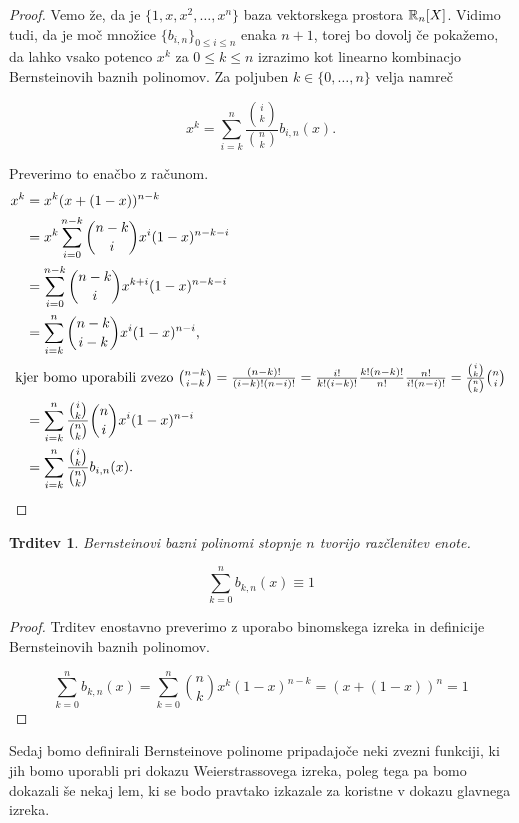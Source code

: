 \documentclass[a4paper, reqno]{amsart}
\theoremstyle{theorem}
\newtheorem{trditev}[izrek]{Trditev}
\theoremstyle{definition}
\begin{document}
\begin{proof}
	Vemo že, da je $\{1, x, x^2, \dots, x^n\}$ baza vektorskega prostora $\mathbb{R}_n[X]$.
	Vidimo tudi, da je moč množice $\{b_{i,n}\}_{0 \leq i \leq n}$ enaka $n + 1$,
	torej bo dovolj če pokažemo, da lahko vsako potenco $x^k$ za $0 \leq k \leq n$
	izrazimo kot linearno kombinacjo Bernsteinovih baznih polinomov. Za poljuben 
	$k \in \{0, \dots, n\}$ velja namreč

	$$ x^k = \sum_{i = k}^{n} \frac{\binom ik}{\binom nk} b_{i, n}(x)\text{.}$$

	Preverimo to enačbo z računom.
	\begin{align*}
	x^k &= x^k(x + (1 - x))^{n - k} \\
	&= x^k \sum_{i = 0}^{n - k} \binom{n - k}{i} x^i(1 - x)^{n - k - i} \\
	&= \sum_{i = 0}^{n - k} \binom{n - k}{i} x^{k + i}(1 - x)^{n - k - i} \\
	&= \sum_{i = k}^{n} \binom{n - k}{i - k} x^i(1 - x)^{n - i} \text{,}\\
\intertext{
	kjer bomo uporabili zvezo $ \binom{n - k}{i - k} = \frac{(n - k)!}{(i - k)!(n - i)!} =
	\frac{i!}{k!(i - k)!} \frac{k! (n - k)!}{n!} \frac{n!}{i!(n - i)!} =
	\frac{\binom ik}{\binom nk} \binom ni $
}
	&= \sum_{i = k}^{n} \frac{\binom ik}{\binom nk} \binom ni x^i(1 - x)^{n - i} \\
	&= \sum_{i = k}^{n} \frac{\binom ik}{\binom nk} b_{i, n}(x)\text{.}
	\end{align*}
\end{proof}

\begin{trditev}
	\label{razclenitev enote}
	Bernsteinovi bazni polinomi stopnje $n$ tvorijo razčlenitev enote.

	$$ \sum_{k=0}^{n}b_{k, n}(x) \equiv 1$$

\end{trditev}

\begin{proof}
	Trditev enostavno preverimo z uporabo binomskega izreka in definicije 
	Bernsteinovih baznih polinomov.

	$$ \sum_{k=0}^{n}b_{k, n}(x) = 
	\sum_{k=0}^{n} \binom nk x^k(1 - x)^{n - k} = 
	(x + (1 - x))^n = 
	1$$
\end{proof}

Sedaj bomo definirali Bernsteinove polinome pripadajoče neki zvezni funkciji, 
ki jih bomo uporabli pri dokazu Weierstrassovega
izreka, poleg tega pa bomo dokazali še nekaj lem, ki se bodo pravtako izkazale za koristne
v dokazu glavnega izreka. 
\end{document}
